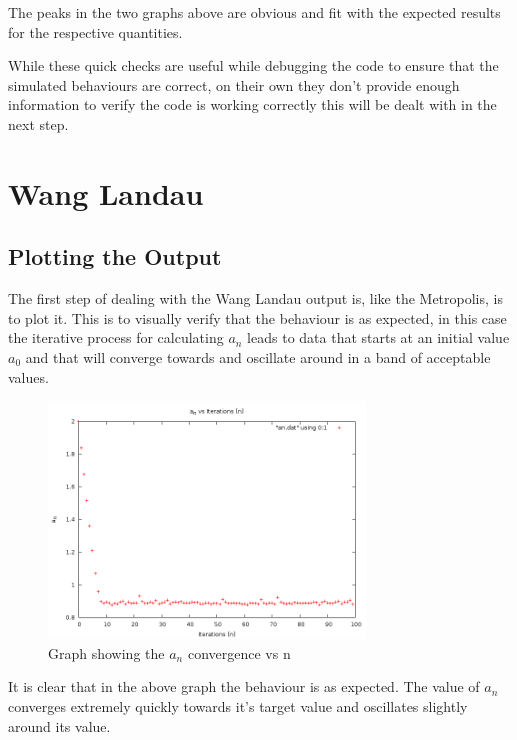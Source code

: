 The peaks in the two graphs above are obvious and fit with the expected results for the respective quantities.

While these quick checks are useful while debugging the code to ensure that the simulated behaviours are correct, on their own they don't provide enough information to verify the code is working correctly this will be dealt with in the next step.

\section{Wang Landau}

\subsection{Plotting the Output}
The first step of dealing with the Wang Landau output is, like the Metropolis, is to plot it.
This is to visually verify that the behaviour is as expected, in this case the iterative process for calculating $a_n$ leads to data that starts at an initial value $a_0$ and that will converge towards and oscillate around in a band of acceptable values.
\begin{figure}[H]
\centering
\includegraphics[width=0.75\textwidth]{4-Results/An16x16Convergence.png}
\caption{Graph showing the $a_n$ convergence vs n}
\end{figure}
It is clear that in the above graph the behaviour is as expected.
The value of $a_n$ converges extremely quickly towards it's target value and oscillates slightly around its value.

